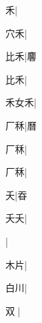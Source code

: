 \begin{multicols}{2}
{{禾}\mktsJzrVerticalBar{}{\cjk{}{\cnsym{}　}{\cnsym{}　}{\cnsym{}　}}|{}\par
{\cjk{}{\cnsym{}　}穴禾}\mktsJzrVerticalBar{}{\cjk{}{\cnsym{}　}{\cnsym{}　}{\cnsym{}　}}|{}\par
{比禾}\mktsJzrVerticalBar{}{\cjk{}{\cnsym{}　}{\cnsym{}　}{\cnsym{}　}}|{\cjk{}麘}\par
{比禾}\mktsJzrVerticalBar{}{\cjk{}{\cnsym{}　}{\cnsym{}　}{\cnsym{}　}}|{}\par
{\cjk{}禾女禾}\mktsJzrVerticalBar{}{\cjk{}{\cnsym{}　}{\cnsym{}　}{\cnsym{}　}}|{}\par
{\cjk{}{\cnsym{}　}厂秝}\mktsJzrVerticalBar{}{\cjk{}{\cnsym{}　}{\cnsym{}　}{\cnsym{}　}}|{\cjk{}曆}\par
{厂秝}\mktsJzrVerticalBar{}{\cjk{}{\cnsym{}　}{\cnsym{}　}{\cnsym{}　}}|{}\par
{厂秝}\mktsJzrVerticalBar{}{\cjk{}{\cnsym{}　}{\cnsym{}　}{\cnsym{}　}}|{}\par
{\cjk{}{\cnsym{}　}{\cnsym{}　}夭}\mktsJzrVerticalBar{}{\cjk{}{\cnsym{}　}{\cnsym{}　}{\cnsym{}　}}|{\cjk{}昋}\par
{夭夭}\mktsJzrVerticalBar{}{\cjk{}{\cnsym{}　}{\cnsym{}　}{\cnsym{}　}}|{}\par
{}\mktsJzrVerticalBar{}{\cjk{}{\cnsym{}　}{\cnsym{}　}{\cnsym{}　}}|{}\par
{\cjk{}{\cnsym{}　}木片}\mktsJzrVerticalBar{}{\cjk{}{\cnsym{}　}{\cnsym{}　}{\cnsym{}　}}|{}\par
{\cjk{}{\cnsym{}　}白川}\mktsJzrVerticalBar{}{\cjk{}{\cnsym{}　}{\cnsym{}　}{\cnsym{}　}}|{}\par
{双{\cnxb{}𠀉}}\mktsJzrVerticalBar{}{\cjk{}{\cnsym{}　}{\cnsym{}　}{\cnsym{}　}}|{}\par
}
\end{multicols}
